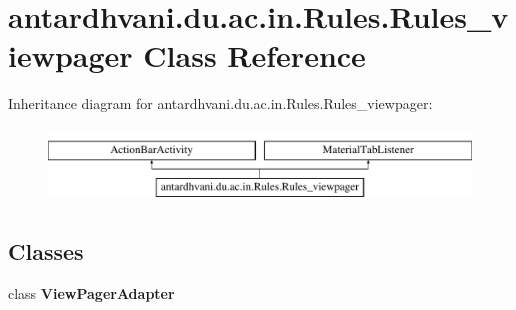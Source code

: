 \hypertarget{classantardhvani_1_1du_1_1ac_1_1in_1_1_rules_1_1_rules__viewpager}{}\section{antardhvani.\+du.\+ac.\+in.\+Rules.\+Rules\+\_\+viewpager Class Reference}
\label{classantardhvani_1_1du_1_1ac_1_1in_1_1_rules_1_1_rules__viewpager}
Inheritance diagram for antardhvani.\+du.\+ac.\+in.\+Rules.\+Rules\+\_\+viewpager\+:\begin{figure}[H]
\begin{center}
\leavevmode
\includegraphics[height=2.000000cm]{classantardhvani_1_1du_1_1ac_1_1in_1_1_rules_1_1_rules__viewpager}
\end{center}
\end{figure}
\subsection*{Classes}
\begin{DoxyCompactItemize}
\item 
class {\bfseries View\+Pager\+Adapter}
\end{DoxyCompactItemize}
